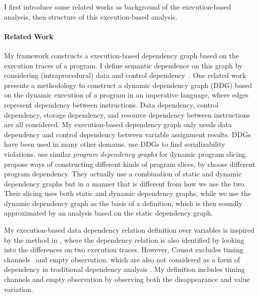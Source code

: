 
I first introduce some related works as background of the execution-based analysis, 
then structure of this execution-based analysis.  
 \paragraph*{Related Work}
 {
My framework constructs a execution-based dependency graph based on the execution traces of a program. I define semantic dependence on this graph by considering (intraprocedural) data and control dependency~\cite{bilardi1996framework,cytron1991efficiently,pollock1989incremental}.    
One related work  
\cite{austin1992dynamic} presents a methodology to construct a dynamic dependency graph (DDG) based on the dynamic execution of a program in an imperative language, where edges represent dependency between instructions. Data dependency, control dependency, storage dependency, and resource dependency between instructions are all considered. My execution-based dependency graph only needs data dependency and control dependency between variable assignment results. 
%
DDGs have been used in many other domains. \cite{nagar2018automated} use DDGs to find serializability violations. \cite{hammer2006dynamic} use similar \emph{program dependency graphs} \cite{ferrante1987program} for dynamic program slicing.
\cite{mastroeni2008data} propose ways of constructing different kinds of program slices, by choose different program dependency. 
They actually use a combination of  
static and dynamic dependency graphs but in a manner that is different from how we use the two. Their slicing uses both static and dynamic dependency graphs, while we use the dynamic dependency graph as the basis of a definition, which is then soundly approximated by an analysis based on the static dependency graph.}

{My execution-based data dependency relation definition over variables 
is inspired by the method in \cite{Cousot19a}, where the dependency relation is also identified by looking into the differences on two execution traces. 
However, Cousot excludes timing channels~\cite{SabelfeldM03} and empty observation, which are also not considered as a form of dependency in traditional dependency analysis \cite{DenningD77}.
My definition includes timing channels and empty observation by observing both the disappearance and value variation.
}
